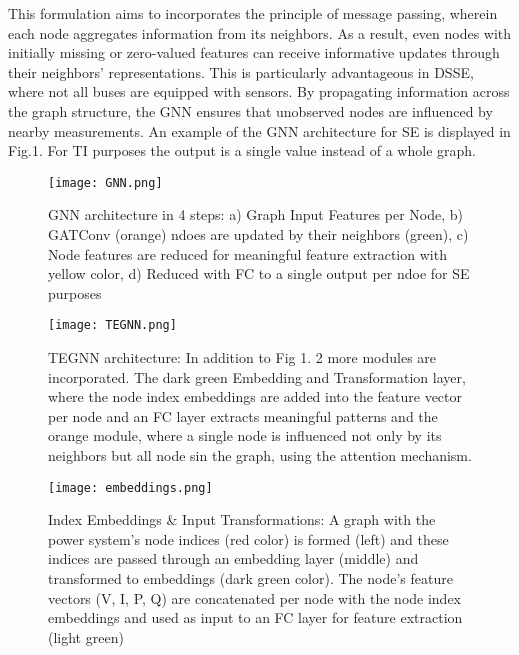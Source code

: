 \documentclass[journal]{IEEEtran}  %
\begin{document}
\vspace{5pt}
This formulation aims to incorporates the principle of message passing, wherein each node aggregates information from its neighbors. As a result, even nodes with initially missing or zero-valued features can receive informative updates through their neighbors’ representations. This is particularly advantageous in DSSE, where not all buses are equipped with sensors. By propagating information across the graph structure, the GNN ensures that unobserved nodes are influenced by nearby measurements. An example of the GNN architecture for SE is displayed in Fig.1. For TI purposes the output is a single value instead of a whole graph.


\begin{figure}[h!]
  \centering
  \texttt{[image: GNN.png]}
  \caption{GNN architecture in 4 steps: a) Graph Input Features per Node, b) GATConv (orange) ndoes are updated by their neighbors (green), c) Node features are reduced for meaningful feature extraction with yellow color, d) Reduced with FC to a single output per ndoe for SE purposes}
  \label{fig:GNN-image}
\end{figure}

\begin{figure*}[t]
  \centering
  \texttt{[image: TEGNN.png]}
  \caption{TEGNN architecture: In addition to Fig 1. 2 more modules are incorporated. The dark green Embedding and Transformation layer, where the node index embeddings are added into the feature vector per node and an FC layer extracts meaningful patterns and the orange module, where a single node is influenced not only by its neighbors but all node sin the graph, using the attention mechanism.}
  \label{fig:TEGNN-image}
\end{figure*}

\begin{figure}[h!]
  \centering
  \texttt{[image: embeddings.png]}
  \caption{Index Embeddings \& Input Transformations: A graph with the power system's node indices (red color) is formed (left) and these indices are passed through an embedding layer (middle) and transformed to embeddings (dark green color). The node's feature vectors (V, I, P, Q) are concatenated per node with the node index embeddings and used as input to an FC layer for feature extraction (light green)}
  \label{fig:GNN-image}
\end{figure}
\end{document}
